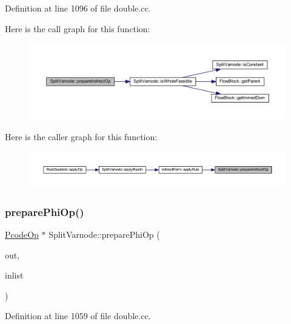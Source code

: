 Definition at line 1096 of file double.\+cc.

Here is the call graph for this function\+:
\nopagebreak
\begin{figure}[H]
\begin{center}
\leavevmode
\includegraphics[width=350pt]{class_split_varnode_a11bfb0c446ec6ea8d2fdd25c9481a801_cgraph}
\end{center}
\end{figure}
Here is the caller graph for this function\+:
\nopagebreak
\begin{figure}[H]
\begin{center}
\leavevmode
\includegraphics[width=350pt]{class_split_varnode_a11bfb0c446ec6ea8d2fdd25c9481a801_icgraph}
\end{center}
\end{figure}
\mbox{\label{class_split_varnode_a1a67136592624e6bd5612cea36e891dd}} 
\subsubsection{\texorpdfstring{preparePhiOp()}{preparePhiOp()}}
{\footnotesize\ttfamily \mbox{\hyperlink{class_pcode_op}{Pcode\+Op}} $\ast$ Split\+Varnode\+::prepare\+Phi\+Op (\begin{DoxyParamCaption}\item[{\mbox{\hyperlink{class_split_varnode}{Split\+Varnode}} \&}]{out,  }\item[{vector$<$ \mbox{\hyperlink{class_split_varnode}{Split\+Varnode}} $>$ \&}]{inlist }\end{DoxyParamCaption})\hspace{0.3cm}{\ttfamily [static]}}



Definition at line 1059 of file double.\+cc.

